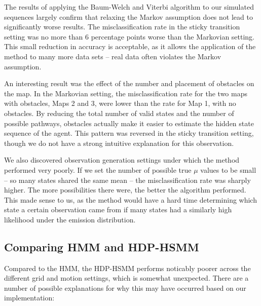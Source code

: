 \documentclass{article}
\begin{document}
The results of applying the Baum-Welch and Viterbi algorithm to our simulated sequences largely confirm that relaxing the Markov assumption does not lead to significantly worse results. The misclassification rate in the sticky transition setting was no more than 6 percentage points worse than the Markovian setting. This small reduction in accuracy is acceptable, as it allows the application of the method to many more data sets -- real data often violates the Markov assumption.

An interesting result was the effect of the number and placement of obstacles on the map. In the Markovian setting, the misclassification rate for the two maps with obstacles, Maps 2 and 3, were lower than the rate for Map 1, with no obstacles. By reducing the total number of valid states and the number of possible pathways, obstacles actually make it easier to estimate the hidden state sequence of the agent. This pattern was reversed in the sticky transition setting, though we do not have a strong intuitive explanation for this observation.

We also discovered observation generation settings under which the method performed very poorly. If we set the number of possible true $\mu$ values to be small -- so many states shared the same mean -- the misclassification rate was sharply higher. The more possibilities there were, the better the algorithm performed. This made sense to us, as the method would have a hard time determining which state a certain observation came from if many states had a similarly high likelihood under the emission distribution.

\subsection{Comparing HMM and HDP-HSMM}

Compared to the HMM, the HDP-HSMM performs noticably poorer across the different grid and motion settings, which is somewhat unexpected. There are a number of possible explanations for why this may have occurred based on our implementation:
\end{document}
